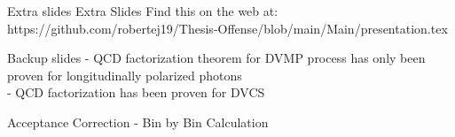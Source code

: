 \documentclass[aspectratio=169]{beamer}
\begin{document}
\begin{frame}{Extra slides}
Extra Slides
Find this on the web at:
https://github.com/robertej19/Thesis-Offense/blob/main/Main/presentation.tex

\end{frame}




\begin{frame}{Backup slides}
      - QCD factorization theorem for DVMP process has only been proven for longitudinally polarized photons\\
    - QCD factorization has been proven for DVCS
 
\end{frame}


\begin{frame}{Acceptance Correction - Bin by Bin Calculation}
\end{frame}
\end{document}
